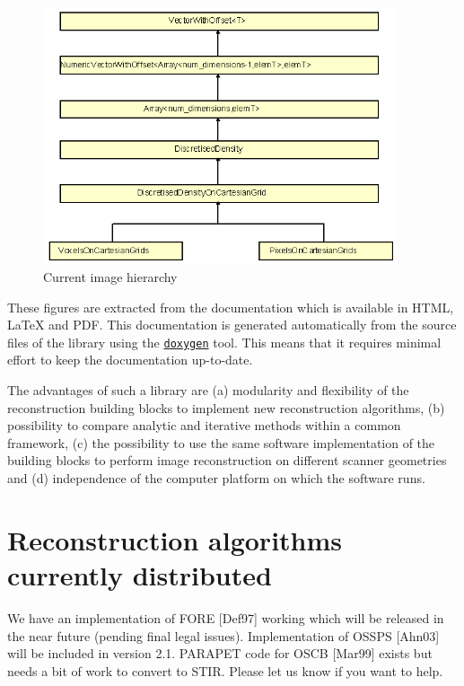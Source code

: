 \documentclass{article}
\def\R2Lurl#1#2{\mbox{\href{#1}{\tt #2}}}
\begin{document}
\begin{figure}[htbp]
\begin{center}
\includegraphics[width=4.100in, height=2.984in]{graphics/STIR-general-overviewFig2}
\caption{Current image hierarchy}
\end{center}
\end{figure}

These figures are extracted from the documentation which is available 
in HTML, LaTeX and PDF. This documentation is generated automatically 
from the source files of the library using the \R2Lurl{http://www.doxygen.org/ }{doxygen} 
tool. This means that it requires minimal effort to keep the 
documentation up-to-date.

The advantages of such a library are (a) modularity and flexibility 
of the reconstruction building blocks to implement new reconstruction 
algorithms, (b) possibility to compare analytic and iterative 
methods within a common framework, (c) the possibility to use 
the same software implementation of the building blocks to perform 
image reconstruction on different scanner geometries and (d) 
independence of the computer platform on which the software runs.



\section{
Reconstruction algorithms currently distributed}

We have an implementation of FORE  [Def97] working which will 
be released in the near future (pending final legal issues). Implementation of 
OSSPS [Ahn03] will be included in version 2.1. PARAPET code for OSCB [Mar99] exists but needs
a bit of work to convert to STIR. Please let us know if you 
want to help.
\end{document}

